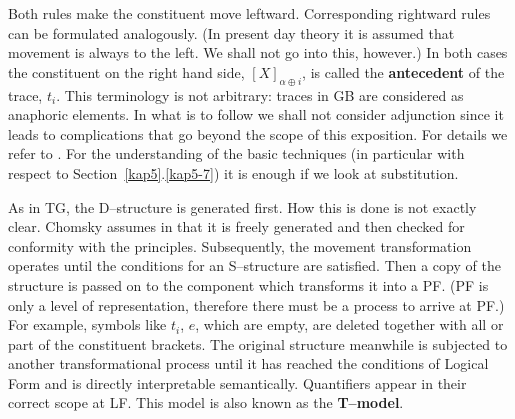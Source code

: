 Both rules make the constituent move leftward. Corresponding rightward 
rules can be formulated analogously. (In present day theory it is 
assumed that movement is always to the left. We shall not go into this, 
however.) In both cases the constituent on the right hand side,
$[X]_{\alpha \oplus i}$, is called the \textbf{antecedent} of the
trace, $t_i$. This terminology is not arbitrary: traces in GB are
considered as anaphoric elements. In what is to follow we shall
not consider adjunction since it leads to complications that
go beyond the scope of this exposition. For details we refer 
to \cite{kracht:adjunction}. For the understanding of the
basic techniques (in particular with respect to
Section~\ref{kap5}.\ref{kap5-7}) it is enough if we look at substitution.

As in TG, the D--structure is generated first. How this is done
is not exactly clear. Chomsky 
assumes in  that
it is freely generated and then checked for conformity with the
principles. Subsequently, the movement transformation operates
until the conditions for an S--structure are satisfied. Then a
copy of the structure is passed on to the component which transforms
it into a PF. (PF is only a level of representation, therefore
there must be a process to arrive at PF.) For example,
symbols like $t_i$, $e$, which are empty, are deleted together
with all or part of the constituent brackets. The original structure
meanwhile is subjected to another transformational process
until it has reached the conditions of Logical Form and is
directly interpretable semantically. Quantifiers appear in their
correct scope at LF. This model is also known as the 
\textbf{T--model}.

